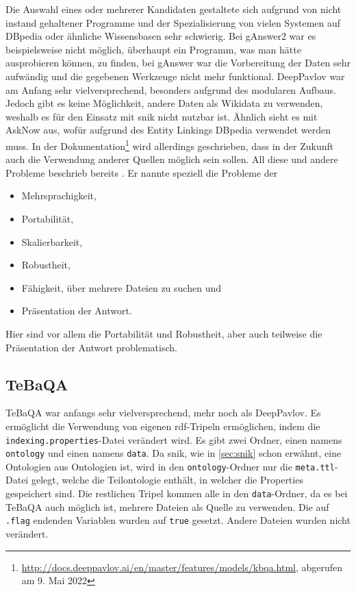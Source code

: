 Die Auswahl eines oder mehrerer Kandidaten gestaltete sich aufgrund von nicht instand gehaltener Programme
und der Spezialisierung von vielen Systemen auf DBpedia oder ähnliche Wissensbasen sehr schwierig.
Bei gAnswer2 war es beispielsweise nicht möglich, überhaupt ein Programm, was man hätte ausprobieren können, zu finden,
bei gAnswer war die Vorbereitung der Daten sehr aufwändig und die gegebenen Werkzeuge nicht mehr funktional.
DeepPavlov war am Anfang sehr vielversprechend, besonders aufgrund des modularen Aufbaus.
Jedoch gibt es keine Möglichkeit, andere Daten als Wikidata zu verwenden, weshalb es für den Einsatz mit \ac{snik} nicht nutzbar ist.
Ähnlich sieht es mit AskNow aus, wofür aufgrund des Entity Linkings DBpedia verwendet werden muss.
In der Dokumentation\footnote{\url{http://docs.deeppavlov.ai/en/master/features/models/kbqa.html}, abgerufen am 9. Mai 2022} wird allerdings geschrieben,
dass in der Zukunft auch die Verwendung anderer Quellen möglich sein sollen.
All diese und andere Probleme beschrieb bereits \citet{diefenbachkbqa}.
Er nannte speziell die Probleme der
\begin{itemize}
  \item Mehrsprachigkeit,
  \item Portabilität,
  \item Skalierbarkeit,
  \item Robustheit,
  \item Fähigkeit, über mehrere Dateien zu suchen und
  \item Präsentation der Antwort.
\end{itemize}
Hier sind vor allem die Portabilität und Robustheit, aber auch teilweise die Präsentation der Antwort problematisch.

\subsection{TeBaQA}

TeBaQA war anfangs sehr vielversprechend, mehr noch als DeepPavlov.
Es ermöglicht die Verwendung von eigenen \ac{rdf}-Tripeln ermöglichen, indem die \texttt{indexing.properties}-Datei verändert wird.
Es gibt zwei Ordner, einen namens \texttt{ontology} und einen namens \texttt{data}.
Da \ac{snik}, wie in \cref{sec:snik} schon erwähnt, eine Ontologien aus Ontologien ist, wird in den \texttt{ontology}-Ordner nur die \texttt{meta.ttl}-Datei gelegt,
welche die Teilontologie enthält, in welcher die Properties gespeichert sind.
Die restlichen Tripel kommen alle in den \texttt{data}-Ordner, da es bei TeBaQA auch möglich ist, mehrere Dateien als Quelle zu verwenden.
Die auf \texttt{.flag} endenden Variablen wurden auf \texttt{true} gesetzt.
Andere Dateien wurden nicht verändert.

